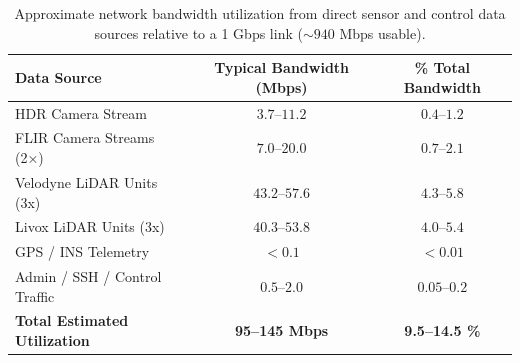 \documentclass{erauthesis}
\begin{document}
\begin{table}[htbp]
\centering
\begin{tabular}{lcc}
\hline
Data Source & Typical Bandwidth (Mbps) & \% Total Bandwidth \\
\hline
HDR Camera Stream & $3.7$--$11.2$ & $0.4$--$1.2$ \\
FLIR Camera Streams (2×) & $7.0$--$20.0$ & $0.7$--$2.1$ \\
Velodyne LiDAR Units (3x) & $43.2$--$57.6$ & $4.3$--$5.8$ \\
Livox LiDAR Units (3x) & $40.3$--$53.8$ & $4.0$--$5.4$ \\
GPS / INS Telemetry & $<0.1$ & $<0.01$ \\
Admin / SSH / Control Traffic & $0.5$--$2.0$ & $0.05$--$0.2$ \\
\hline
\textbf{Total Estimated Utilization} & \textbf{95--145 Mbps} & \textbf{9.5--14.5 \%} \\
\hline
\end{tabular}
\caption{Approximate network bandwidth utilization from direct sensor and control data sources relative to a 1 Gbps link ($\sim940$ Mbps usable).}
\label{table:network_bandwidth}
\end{table}









\end{document}
